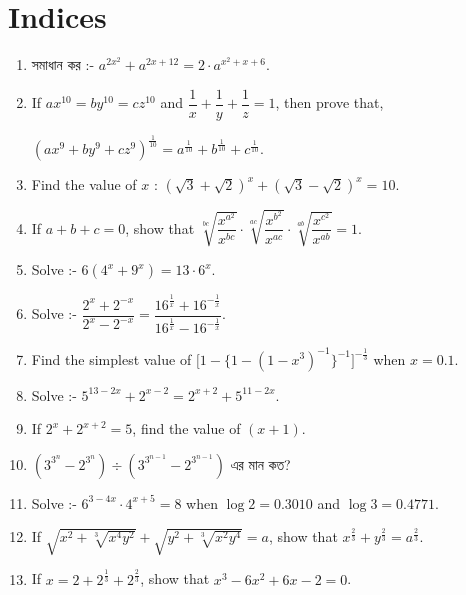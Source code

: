 \documentclass[11pt, a4paper]{article}
\begin{document}
\section{Indices}
\begin{enumerate}

	\item \textbengali{সমাধান কর} :- $ a^{2x^2} + a^{2x+12} = 2\cdot a^{x^2+x+6} $.
	
	\item If $ ax^{10} = by^{10} = cz^{10} $ and $ \dfrac{1}{x} + \dfrac{1}{y} + \dfrac{1}{z} = 1 $, then prove that,\begin{center} $ \left( ax^9 + by^9 + cz^9 \right)^{\frac{1}{10}} = a^{\frac{1}{10}} + b^{\frac{1}{10}} + c^{\frac{1}{10}} $. \end{center}
	
	\item Find the value of $x$ : $ \left(\sqrt{3} + \sqrt{2} \right)^x + \left(\sqrt{3} - \sqrt{2} \right)^x = 10 $.
	
	\item If $ a+b+c = 0 $, show that $ \sqrt[bc]{\dfrac{x^{a^2}}{x^{bc}}} \cdot \sqrt[ac]{\dfrac{x^{b^2}}{x^{ac}}} \cdot \sqrt[ab]{\dfrac{x^{c^2}}{x^{ab}}}  = 1 $.
	
	\item Solve :- $ 6(4^x + 9^x) = 13 \cdot 6^x $.
	
	\item Solve :- $ \dfrac{2^x + 2^{-x}}{2^x - 2^{-x}} = \dfrac{16^{\frac{1}{x}} + 16^{-\frac{1}{x}} }{16^{\frac{1}{x}} - 16^{-\frac{1}{x}}}$.
	
	\item Find the simplest value of $ \big[ 1-\{1-(1-x^3)^{-1}\}^{-1}\big]^{-\frac{1}{3}} $ when $ x = 0.1 $.
	
	\item Solve :- $ 5^{13 - 2x} + 2^{x-2} = 2^{x+2} + 5^{11-2x} $.
	
	\item If $ 2^x + 2^{x+2} = 5 $, find the value of $ (x+1) $.
	
	\item $ \left(  3^{3^{n}} - 2^{3^{n}} \right) \div \left(  3^{3^{n-1}} - 2^{3^{n-1}} \right) $ \textbengali{এর মান কত?}
	
	\item Solve :- $ 6^{3-4x} \cdot 4^{x+5} = 8 $ when $ \log 2 = 0.3010 $ and $ \log 3 = 0.4771 $.
	
	\item If $ \sqrt{x^2 + \sqrt[3]{x^4y^2}} + \sqrt{y^2 + \sqrt[3]{x^2y^4}} = a $, show that $ x^{\frac{2}{3}} + y^{\frac{2}{3}} = a^{\frac{2}{3}} $.
	
	\item If $ x = 2 + 2^{\frac{1}{3}} + 2^{\frac{2}{3}} $, show that $ x^3 - 6x^2 + 6x - 2 = 0 $.


\end{enumerate}
\end{document}
